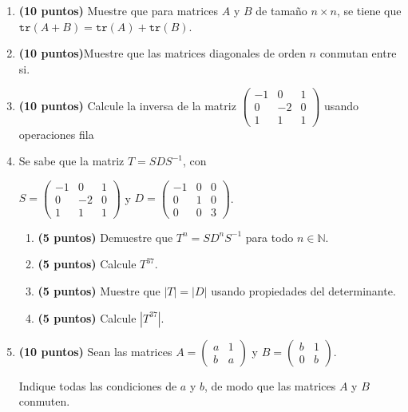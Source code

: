 \documentclass[12pt]{article}
\theoremstyle{exampstyle}
\theoremstyle{definition}
\theoremstyle{break}
\numberwithin{equation}{section}
\begin{document}
\begin{enumerate}

 \item {\bf (10 puntos)} Muestre que para matrices $A$ y $B$ de tamaño $n \times n$, se tiene que ${\texttt{tr}(A+B)=\texttt{tr}(A)+\texttt{tr}(B)}$.
    

        \item {\bf (10 puntos)}Muestre que las matrices diagonales de orden $n$ conmutan entre si.

\item {\bf (10 puntos)} Calcule la inversa de la matriz $\begin{pmatrix} -1 & 0 & 1 \\ 0 & -2 & 0 \\ 1 & 1 & 1 \end{pmatrix}$ usando operaciones fila

        \item Se sabe que la matriz $T= S D S^{-1}$, con 
    \begin{center}
        $S=\begin{pmatrix} -1 & 0 & 1 \\ 0 & -2 & 0 \\ 1 & 1 & 1 \end{pmatrix}$ \quad y \quad $D= \begin{pmatrix} -1 & 0 & 0 \\ 0 & 1 & 0 \\ 0 & 0 & 3 \end{pmatrix}$. 
    \end{center}
        \begin{enumerate}
    \item {\bf (5 puntos)} Demuestre que $T^n=SD^nS^{-1}$ para todo $n\in \mathbb{N}$.
            \item {\bf (5 puntos)} Calcule $T^{37}$.
            \item {\bf (5 puntos)} Muestre que $|T|=|D|$ usando propiedades del determinante.
            \item {\bf (5 puntos)} Calcule $|T^{37}|$.
        \end{enumerate}
        
        

        \item {\bf (10 puntos)} Sean las matrices  $A = \begin{pmatrix} a & 1\\ b & a 
\end{pmatrix}$ y $B = \begin{pmatrix} b & 1\\ 0 & b 
\end{pmatrix}$.

Indique todas las condiciones de $a$ y $ b$, de modo que las matrices $A$ y $B$ conmuten.


    \end{enumerate}
\end{document}
